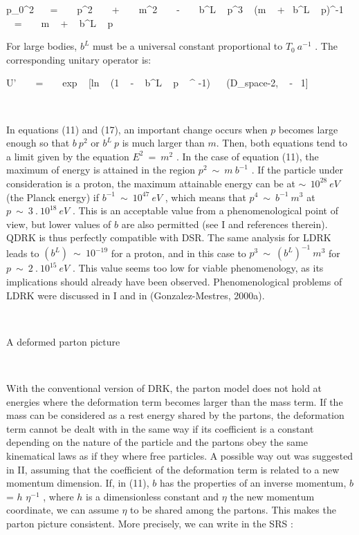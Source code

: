 \documentclass[a4paper,12pt,dvips]{article}
\makeatletter
\renewcommand{\section}{\@startsection{section}{1}{0in}
	{0.4\baselineskip}{0.1\baselineskip}{\Large\bf}}
\makeatother
\begin{document}
\equation
p_0^2~ ~ = ~ ~ p^2 ~ ~ + ~ ~ m^2 ~ ~ - ~ ~ b^L ~ p^3 ~ (m ~ +~ b^L ~ p)^{-1}
\endequation
\equation
\sigma ~ ~ = ~ ~ m ~ + ~ b^L ~ p
\endequation

For large bodies, $b^L$ must be a universal constant proportional to $T_0 ~ a^{-1}$ . The corresponding unitary operator is:

\equation
U' ~ ~ = ~ ~ exp ~ [ln ~ (1 ~ - ~ b^L ~ p ~ \sigma ^ {-1}) ~ ~(D_{space-2, } ~ - ~1]
\endequation
\noindent

~ 

In equations (11) and (17), an important change occurs when $p$ becomes large enough so that $ b ~ p^2$ or $b^L ~ p$ is much larger than $m$. Then, both equations tend to a limit given by the equation $E^2 ~ = ~m^2$ . In the case of equation (11), the maximum of energy is attained in the region $p^2 ~ \sim ~ m ~ b^{-1}$ . If the particle under consideration is a proton, the maximum attainable energy can be at $\sim ~ ~ 10^{28} ~ eV$ (the Planck energy) if $b^{-1} ~ \sim ~ 10^{47} ~ eV$ , which means that $p^4 ~ \sim ~ b^{-1} ~ m^3$ at $p ~ \sim ~ 3 ~ . ~ 10^{18} ~ eV$ . This is an acceptable value from a phenomenological point of view, but lower values of $b$ are also permitted (see I and references therein). QDRK is thus perfectly compatible with DSR. The same analysis for LDRK leads to $ (b^L) ~ \sim ~ 10^{-19}$ for a proton, and in this case to $p^3 ~ \sim ~ (b^L)^{-1} ~ m^3$ for $p ~ \sim ~ 2 ~ . ~ 10^{15} ~ eV$ . This value seems too low for viable phenomenology, as its implications should already have been observed. Phenomenological problems of LDRK were discussed in I and in (Gonzalez-Mestres, 2000a).

~
~ 

\section{A deformed parton picture}
\label{DPP.sec}

~

With the conventional version of DRK, the parton model does not hold at energies where the deformation term becomes larger than the mass term. If the mass can be considered as a rest energy shared by the partons, the deformation term cannot be dealt with in the same way if its coefficient is a constant depending on the nature of the particle and the partons obey the same kinematical laws as if they where free particles. A possible way out was suggested in II, assuming that the coefficient of the deformation term is related to a new momentum dimension. If, in (11), $b$ has the properties of an inverse momentum, $b$ = $h$ $\eta ^{-1}$ , where $h$ is a dimensionless constant and $\eta$ the new momentum coordinate, we can assume $\eta $ to be shared among the partons. This makes the parton picture consistent. More precisely, we can write in the SRS :
\end{document}
